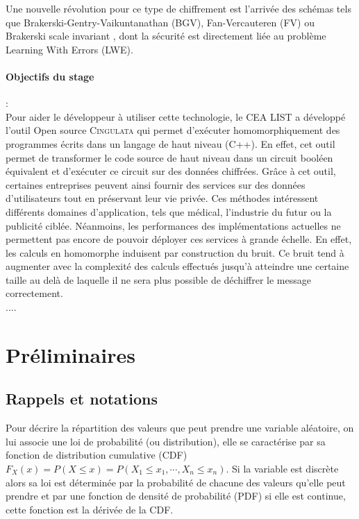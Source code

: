 \documentclass[11pt, headsepline, a4paper, fleqn, oneside]{article}
\begin{document}
Une nouvelle révolution pour ce type de chiffrement est l'arrivée des schémas tels que Brakerski-Gentry-Vaikuntanathan (BGV), Fan-Vercauteren (FV) ou Brakerski \og scale invariant \fg, dont la sécurité est directement liée au problème Learning With Errors (LWE).\\

\paragraph{Objectifs du stage}:\\

Pour aider le développeur à utiliser cette technologie, le CEA LIST a développé l’outil Open source \textsc{Cingulata} qui permet d’exécuter homomorphiquement des programmes écrits dans un langage de haut niveau (C++). En effet, cet outil permet de transformer le code source de haut niveau dans un circuit booléen équivalent et d’exécuter ce circuit sur des données chiffrées. Grâce à cet outil, certaines entreprises peuvent ainsi fournir des services sur des données d’utilisateurs tout en préservant leur vie privée. Ces méthodes intéressent différents domaines d’application, tels que médical, l'industrie du futur ou la publicité ciblée. Néanmoins, les performances des implémentations actuelles ne permettent pas encore de pouvoir déployer ces services à grande échelle. En effet, les calculs en homomorphe induisent par construction du bruit. Ce bruit tend à augmenter avec la complexité des calculs effectués jusqu'à atteindre une certaine taille au delà de laquelle il ne sera plus possible de déchiffrer le message correctement.\\
....
\section{Préliminaires}
\subsection{Rappels et notations}
Pour décrire la répartition des valeurs que peut prendre une variable aléatoire, on lui associe une loi de probabilité (ou distribution), elle se caractérise par sa fonction de distribution cumulative (CDF) $F_{X}(x)=P(X \leq x)=P\left(X_{1} \leq x_{1}, \cdots, X_{n} \leq x_{n}\right)$. Si la variable est discrète alors sa loi est déterminée par la probabilité de chacune des valeurs qu'elle peut prendre et par une fonction de densité de probabilité (PDF) si elle est continue, cette fonction est la dérivée de la CDF.
\end{document}
